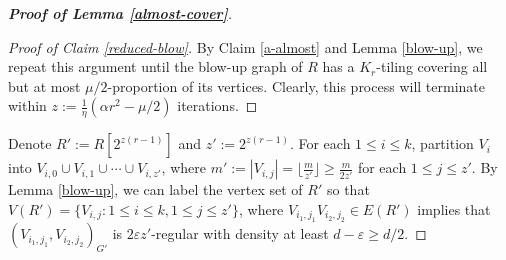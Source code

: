 \documentclass[11pt, a4paper]{article}
\theoremstyle{definition}
\newcommand{\eps}{\varepsilon}
\newcommand{\<}{\subseteq}
\begin{document}
\begin{proof}[\bf Proof of Lemma \ref{almost-cover}]
\begin{proof}[Proof of Claim \ref{reduced-blow}]
By Claim \ref{a-almost} and Lemma \ref{blow-up}, we repeat this argument until the blow-up graph of $R$ has a  $K_r$-tiling covering all but at most $\mu/2$-proportion of its vertices. Clearly, this process will terminate within $z:=\frac{1}{\eta}(\alpha r^2-\mu/2)$ iterations. 
\end{proof}
Denote $R':=R[2^{z(r-1)}]$ and $z':=2^{z(r-1)}$. For each $1\leq i\leq k$, partition $V_i$ into $V_{i,0}\cup V_{i,1}\cup \cdots\cup V_{i,z'}$, where $m':=|V_{i,j}|=\lfloor\frac{m}{z'}\rfloor\geq \frac{m}{2z'}$ for each $1\leq j\leq z'$. %
By Lemma \ref{blow-up}, we can label the vertex set of $R'$ so that $V(R')=\{V_{i,j}:1\leq i\leq k,1\leq j\leq z'\}$, where $V_{i_1,j_1}V_{i_2,j_2}\in E(R')$ implies that $(V_{i_1,j_1},V_{i_2,j_2})_{G'}$ is $2\eps  z'$-regular with density at least $d-\eps \geq d/2$.


\end{proof}
\end{document}
